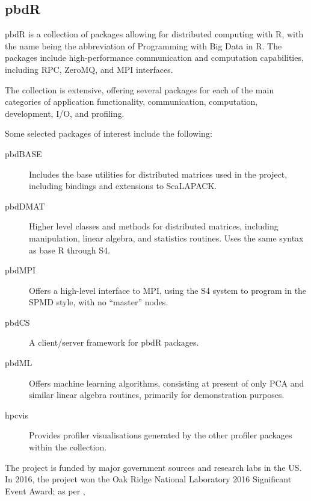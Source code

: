 \hypertarget{pbdr}{%
    \subsection{pbdR}\label{pbdr}}

pbdR is a collection of packages allowing for distributed computing with
R\cite{pbdBASEpackage}, with the name being the abbreviation of
Programming with Big Data in R. The packages include high-performance
communication and computation capabilities, including RPC, ZeroMQ, and
MPI interfaces.

The collection is extensive, offering several packages for each of the
main categories of application functionality, communication,
computation, development, I/O, and profiling.

Some selected packages of interest include the following:

\begin{description}

    \item[pbdBASE]
        Includes the base utilities for distributed matrices used in the
        project, including bindings and extensions to
        ScaLAPACK\cite{pbdBASEpackage}.
    \item[pbdDMAT]
        Higher level classes and methods for distributed matrices, including
        manipulation, linear algebra, and statistics routines. Uses the same
        syntax as base R through S4\cite{pbdDMATpackage}.
    \item[pbdMPI]
        Offers a high-level interface to MPI, using the S4 system to program in
        the SPMD style, with no ``master'' nodes\cite{Chen2012pbdMPIpackage}.
    \item[pbdCS]
        A client/server framework for pbdR
        packages\cite{Schmidt2015pbdCSpackage}.
    \item[pbdML]
        Offers machine learning algorithms, consisting at present of only PCA
        and similar linear algebra routines, primarily for demonstration
        purposes\cite{schmidt20}.
    \item[hpcvis]
        Provides profiler visualisations generated by the other profiler
        packages within the collection\cite{hpcvis}.
\end{description}

The project is funded by major government sources and research labs in
the US. In 2016, the project won the Oak Ridge National Laboratory 2016
Significant Event Award; as per \cite{pbdR2012},

